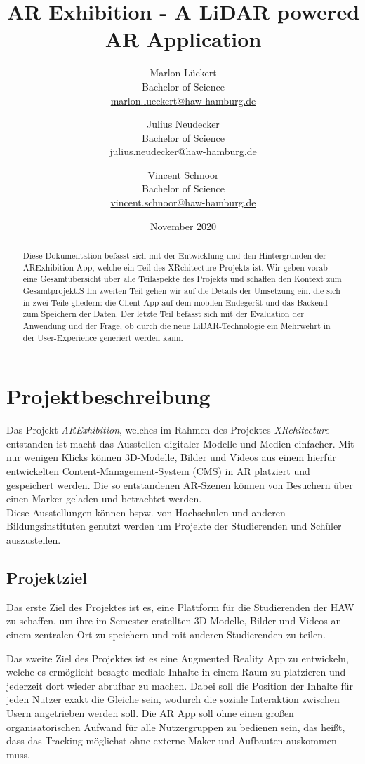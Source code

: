 \documentclass[titlepage, a4paper, 11pt]{scrartcl}
\title{AR Exhibition - A LiDAR powered AR Application}
\author{Marlon Lückert \\ Bachelor of Science \\ \href{mailto:marlon.lueckert@haw-hamburg.de}{marlon.lueckert@haw-hamburg.de} 
\and Julius Neudecker \\ Bachelor of Science \\ \href{mailto:julius.neudecker@haw-hamburg.de}{julius.neudecker@haw-hamburg.de}
\and Vincent Schnoor \\ Bachelor of Science \\ \href{mailto:vincent.schnoor@haw-hamburg.de}{vincent.schnoor@haw-hamburg.de} }
\date{November 2020}
\begin{document}
  \maketitle

  \tableofcontents

  \begin{abstract}
    Diese Dokumentation befasst sich mit der Entwicklung und den Hintergründen der ARExhibition App, welche ein Teil des XRchitecture-Projekts ist.
    Wir geben vorab eine Gesamtübersicht über alle Teilaspekte des Projekts und schaffen den Kontext zum Gesamtprojekt.S
    Im zweiten Teil gehen wir auf die Details der Umsetzung ein, die sich in zwei Teile gliedern: die Client App auf dem mobilen Endegerät und das Backend zum Speichern der Daten.
    Der letzte Teil befasst sich mit der Evaluation der Anwendung und der Frage, ob durch die neue LiDAR-Technologie ein Mehrwehrt in der User-Experience generiert werden kann.
  \end{abstract}

  \section{Projektbeschreibung}
    Das Projekt \textit{ARExhibition}, welches im Rahmen des Projektes \textit{XRchitecture} entstanden ist macht das Ausstellen digitaler Modelle und Medien einfacher. 
    Mit nur wenigen Klicks können 3D-Modelle, Bilder und Videos aus einem hierfür entwickelten Content-Management-System (CMS) in AR platziert und gespeichert werden. 
    Die so entstandenen AR-Szenen können von Besuchern über einen Marker geladen und betrachtet werden.\\
    Diese Ausstellungen können bspw. von Hochschulen und anderen Bildungsinstituten genutzt werden um Projekte der Studierenden und Schüler auszustellen.

    \subsection{Projektziel}
      Das erste Ziel des Projektes ist es, eine Plattform für die Studierenden der HAW zu schaffen, um ihre im Semester erstellten 3D-Modelle, 
      Bilder und Videos an einem zentralen Ort zu speichern und mit anderen Studierenden zu teilen.

      Das zweite Ziel des Projektes ist es eine Augmented Reality App zu entwickeln, welche es ermöglicht besagte mediale Inhalte in einem Raum zu platzieren und jederzeit dort wieder abrufbar zu machen.
      Dabei soll die Position der Inhalte für jeden Nutzer exakt die Gleiche sein, wodurch die soziale Interaktion zwischen Usern angetrieben werden soll.
      Die AR App soll ohne einen großen organisatorischen Aufwand für alle Nutzergruppen zu bedienen sein, das heißt, dass das Tracking möglichst ohne externe Maker und Aufbauten auskommen muss.
\end{document}
